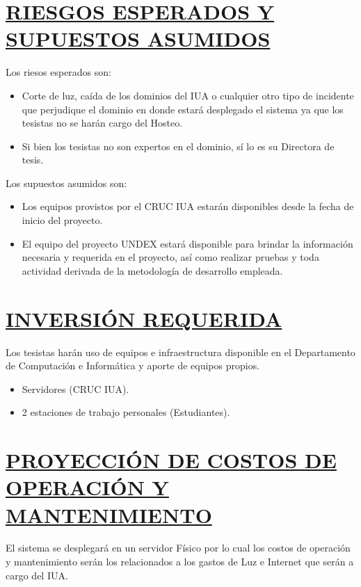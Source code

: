 \section*{\underline{RIESGOS ESPERADOS Y SUPUESTOS ASUMIDOS}}
Los riesos esperados son:
\begin{itemize}
	\item Corte de luz, caída de los dominios del IUA o cualquier otro tipo de incidente que perjudique el dominio en donde estará desplegado el sistema ya que los tesistas no se harán cargo del Hosteo.
	\item Si bien los tesistas no son expertos en el dominio, sí lo es su Directora de tesis.\\
\end{itemize}

Los supuestos asumidos son:
\begin{itemize}
	\item Los equipos provistos por el CRUC IUA estarán disponibles desde la fecha de inicio del proyecto.
	\item El equipo del proyecto UNDEX estará disponible para brindar la información necesaria y requerida en el proyecto, así como realizar pruebas y toda actividad derivada de la metodología de desarrollo empleada.\\
\end{itemize}


\section*{\underline{INVERSIÓN REQUERIDA}}
Los tesistas harán uso de equipos e infraestructura disponible en el Departamento de Computación e Informática y aporte de equipos propios.
\begin{itemize}
	\item Servidores (CRUC IUA).
	\item 2 estaciones de trabajo personales (Estudiantes).\\
\end{itemize}

\section*{\underline{PROYECCIÓN DE COSTOS DE OPERACIÓN Y MANTENIMIENTO}}
El sistema se desplegará en un servidor Físico por lo cual los costos de operación y mantenimiento serán los relacionados a los gastos de Luz e Internet que serán a cargo del IUA. \\

